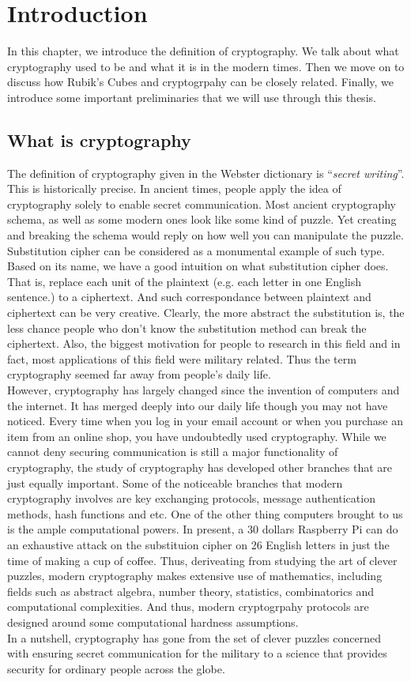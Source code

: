 \doublespacing{}
\chapter{Introduction}
In this chapter, we introduce the definition of cryptography. We talk about what cryptography used to be and what it is in the modern times. Then we move on to discuss how Rubik's Cubes and cryptogrpahy can be closely related. Finally, we introduce some important preliminaries that we will use through this thesis.

\section{What is cryptography}
The definition of cryptography given in the Webster dictionary is ``\textit{secret writing}''. This is historically precise. In ancient times, people apply the idea of cryptography solely to enable secret communication. Most ancient cryptography schema, as well as some modern ones look like some kind of puzzle. Yet creating and breaking the schema would reply on how well you can manipulate the puzzle. Substitution cipher can be considered as a monumental example of such type. Based on its name, we have a good intuition on what substitution cipher does. That is, replace each unit of the plaintext (e.g. each letter in one English sentence.) to a ciphertext. And such correspondance between plaintext and ciphertext can be very creative. Clearly, the more abstract the substitution is, the less chance people who don't know the substitution method can break the ciphertext. Also, the biggest motivation for people to research in this field and in fact, most applications of this field were military related. Thus the term cryptography seemed far away from people's daily life. \\
However, cryptography has largely changed since the invention of computers and the internet. It has merged deeply into our daily life though you may not have noticed. Every time when you log in your email account or when you purchase an item from an online shop, you have undoubtedly used cryptography. While we cannot deny securing communication is still a major functionality of cryptography, the study of cryptography has developed other branches that are just equally important. Some of the noticeable branches that modern cryptography involves are key exchanging protocols, message authentication methods, hash functions and etc. One of the other thing computers brought to us is the ample computational powers. In present, a 30 dollars Raspberry Pi can do an exhaustive attack on the substituion cipher on 26 English letters in just the time of making a cup of coffee. Thus, deriveating from studying the art of clever puzzles, modern cryptography makes extensive use of mathematics, including fields such as abstract algebra, number theory, statistics, combinatorics and computational complexities. And thus, modern cryptogrpahy protocols are designed around some computational hardness assumptions. \\
In a nutshell, cryptography has gone from the set of clever puzzles concerned with ensuring secret communication for the military to a science that provides security for ordinary people across the globe.

